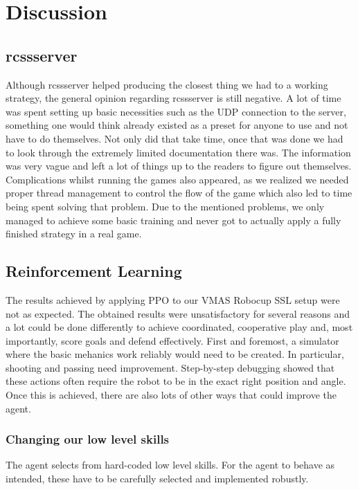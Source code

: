 \section{Discussion}
\label{section:disc}

\subsection{rcssserver}
Although rcssserver helped producing the closest thing we had to a working strategy, the general opinion regarding rcssserver is still negative. A lot of time was spent setting up basic necessities such as the UDP connection to the server, something one would think already existed as a preset for anyone to use and not have to do themselves. Not only did that take time, once that was done we had to look through the extremely limited documentation there was. The information was very vague and left a lot of things up to the readers to figure out themselves. Complications whilst running the games also appeared, as we realized we needed proper thread management to control the flow of the game which also led to time being spent solving that problem. Due to the mentioned problems, we only managed to achieve some basic training and never got to actually apply a fully finished strategy in a real game.

\subsection{Reinforcement Learning}
The results achieved by applying PPO to our VMAS Robocup SSL setup were not as expected.
The obtained results were unsatisfactory for several reasons and a lot could be done differently to achieve coordinated, cooperative play and, most importantly, score goals and defend effectively.
First and foremost, a simulator where the basic mehanics work reliably would need to be created. In particular, shooting and passing need improvement. Step-by-step debugging showed that these actions often require the robot to be in the exact right position and angle.
Once this is achieved, there are also lots of other ways that could improve the agent.

\subsubsection{Changing our low level skills}
The agent selects from hard-coded low level skills. For the agent to behave as intended, these have to be carefully selected and implemented robustly.

